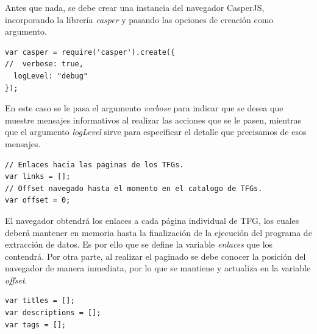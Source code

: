 \lhead{\emph{\ChapterFour{}}}
\lstset{
   language=Javascript
}

Antes que nada, se debe crear una instancia del navegador CasperJS, incorporando la librería \textit{casper} y pasando las opciones de creación como argumento.

\begin{center}
\begin{minipage}{\linewidth}
\begin{lstlisting}[caption=Creación del navegador CasperJS.]
var casper = require('casper').create({
//  verbose: true,
  logLevel: "debug"
});
\end{lstlisting}
\end{minipage}
\end{center}




En este caso se le pasa el argumento \textit{verbose} para indicar que se desea que muestre mensajes informativos al realizar las acciones que se le pasen, mientras que el argumento \textit{logLevel} sirve para especificar el detalle que precisamos de esos mensajes. %

\begin{center}
\begin{minipage}{\linewidth}
\begin{lstlisting}[caption=Estructuras de datos para la navegación por la página.]
// Enlaces hacia las paginas de los TFGs.
var links = [];
// Offset navegado hasta el momento en el catalogo de TFGs.
var offset = 0;
\end{lstlisting}
\end{minipage}
\end{center}

El navegador obtendrá los enlaces a cada página individual de TFG, los cuales deberá mantener en memoria hasta la finalización de la ejecución del programa de extracción de datos.
Es por ello que se define la variable \textit{enlaces} que los contendrá. Por otra parte, al realizar el paginado se debe conocer la posición del navegador de manera inmediata, por lo que se mantiene y actualiza en la variable \textit{offset}. %

\begin{center}
\begin{minipage}{\linewidth}
\begin{lstlisting}[caption=Estructuras de datos para las características de cada TFG.]
var titles = [];
var descriptions = [];
var tags = [];
\end{lstlisting}
\end{minipage}
\end{center}

